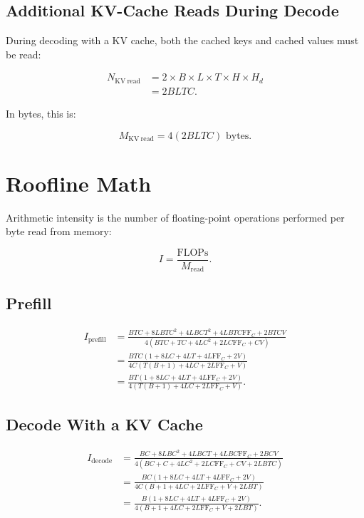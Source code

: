 \documentclass{article}
\begin{document}
\subsection{Additional KV-Cache Reads During Decode}

During decoding with a KV cache, both the cached keys and cached values must be read:

\begin{align}
N_{\mathrm{KV\ read}}
   &= 2 \times B \times L \times T \times H \times H_d \\
   &= \boxed{2BLTC}.
\end{align}

In bytes, this is:

\begin{equation}
M_{\mathrm{KV\ read}}
   = 4\left(2BLTC\right) \text{ bytes}.
\end{equation}

\section{Roofline Math}

Arithmetic intensity is the number of floating-point operations performed per byte read from memory:

\begin{equation}
I = \frac{\mathrm{FLOPs}}{M_{\mathrm{read}}}.
\end{equation}

\subsection{Prefill}

\begin{align}
I_{\mathrm{prefill}}
&=
\frac{
BTC + 8LBTC^2 + 4LBCT^2 + 4LBTC\mathrm{FF}_C + 2BTCV
}{
4\left(BTC + TC + 4LC^2 + 2LC\mathrm{FF}_C + CV\right)
} \\
&=
\frac{
BTC\left(1 + 8LC + 4LT + 4L\mathrm{FF}_C + 2V\right)
}{
4C\left(T(B+1) + 4LC + 2L\mathrm{FF}_C + V\right)
} \\
&= \boxed{
\frac{
BT\left(1 + 8LC + 4LT + 4L\mathrm{FF}_C + 2V\right)
}{
4\left(T(B+1) + 4LC + 2L\mathrm{FF}_C + V\right)
}
}.
\end{align}

\subsection{Decode With a KV Cache}

\begin{align}
I_{\mathrm{decode}}
&=
\frac{
BC + 8LBC^2 + 4LBCT + 4LBC\mathrm{FF}_C + 2BCV
}{
4\left(BC + C + 4LC^2 + 2LC\mathrm{FF}_C + CV + 2LBTC\right)
} \\
&=
\frac{
BC\left(1 + 8LC + 4LT + 4L\mathrm{FF}_C + 2V\right)
}{
4C\left(B + 1 + 4LC + 2L\mathrm{FF}_C + V + 2LBT\right)
} \\
&= \boxed{
\frac{
B\left(1 + 8LC + 4LT + 4L\mathrm{FF}_C + 2V\right)
}{
4\left(B + 1 + 4LC + 2L\mathrm{FF}_C + V + 2LBT\right)
}
}.
\end{align}
\end{document}
